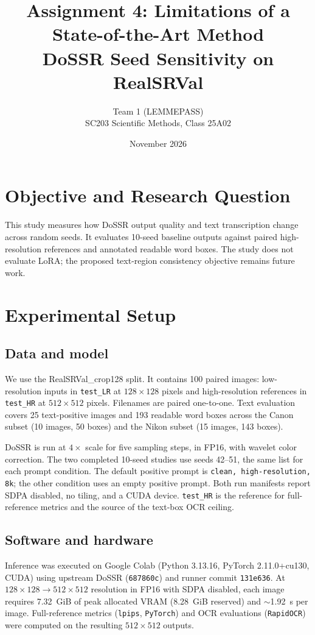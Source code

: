 \documentclass[11pt]{article}
\title{Assignment 4: Limitations of a State-of-the-Art Method\\
\large DoSSR Seed Sensitivity on RealSRVal}
\author{Team 1 (LEMMEPASS)\\SC203 Scientific Methods, Class 25A02}
\date{November 2026}
\begin{document}
\maketitle

\section{Objective and Research Question}
This study measures how DoSSR output quality and text transcription change across random seeds. It evaluates 10-seed baseline outputs against paired high-resolution references and annotated readable word boxes. The study does not evaluate LoRA; the proposed text-region consistency objective remains future work.

\section{Experimental Setup}
\subsection{Data and model}
We use the RealSRVal\_crop128 split. It contains 100 paired images: low-resolution inputs in \texttt{test\_LR} at $128\times128$ pixels and high-resolution references in \texttt{test\_HR} at $512\times512$ pixels. Filenames are paired one-to-one. Text evaluation covers 25 text-positive images and 193 readable word boxes across the Canon subset (10 images, 50 boxes) and the Nikon subset (15 images, 143 boxes).

DoSSR is run at $4\times$ scale for five sampling steps, in FP16, with wavelet color correction. The two completed 10-seed studies use seeds 42--51, the same list for each prompt condition. The default positive prompt is \texttt{clean, high-resolution, 8k}; the other condition uses an empty positive prompt. Both run manifests report SDPA disabled, no tiling, and a CUDA device. \texttt{test\_HR} is the reference for full-reference metrics and the source of the text-box OCR ceiling.

\subsection{Software and hardware}
Inference was executed on Google Colab (Python 3.13.16, PyTorch 2.11.0+cu130, CUDA) using upstream DoSSR (\texttt{687860c}) and runner commit \texttt{131e636}. At $128\times128 \to 512\times512$ resolution in FP16 with SDPA disabled, each image requires 7.32~GiB of peak allocated VRAM (8.28~GiB reserved) and $\sim$1.92~s per image. Full-reference metrics (\texttt{lpips}, \texttt{PyTorch}) and OCR evaluations (\texttt{RapidOCR}) were computed on the resulting $512\times512$ outputs.
\end{document}
